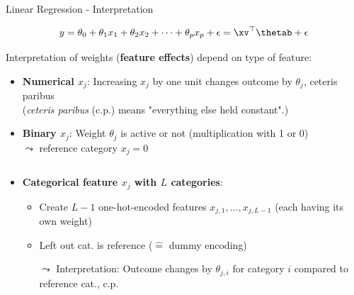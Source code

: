 \documentclass[11pt,compress,t,notes=noshow, aspectratio=169, xcolor=table]{beamer}
\begin{document}

\begin{frame}{Linear Regression - Interpretation}

$$y = \theta_0 + \theta_1 x_1 + \theta_2 x_2 + \dots + \theta_p x_p + \epsilon = \xv^\top \thetab + \epsilon$$

    Interpretation of weights (\textbf{feature effects}) depend on type of feature:
    \begin{itemize}[<+->]
        \item \textbf{Numerical $x_j$}: Increasing $x_j$ by one unit changes outcome by $\theta_j$, ceteris paribus \\ (\textit{ceteris paribus} (c.p.) means "everything else held constant".)
        \item \textbf{Binary $x_j$}: Weight $\theta_j$ is active or not (multiplication with 1 or 0)\\
        $\leadsto$ reference category $x_j = 0$
    \end{itemize}
%
\begin{columns}[T, totalwidth = \textwidth]
\begin{column}{0.62\textwidth}
    \begin{itemize}
        \item<3-> %
        \textbf{Categorical feature $x_j$ with $L$ categories}: 
        \begin{itemize}
            \item Create $L-1$ one-hot-encoded features $x_{j,1}, \hdots, x_{j,L-1}$ (each having its own weight)
            \item Left out cat. is reference ($\hat =$ dummy encoding)
            \item[$\leadsto$] Interpretation:
        Outcome changes by $\theta_{j,i}$ for category $i$ compared to reference cat.,  c.p.
        \end{itemize}

\end{itemize}
\end{column}
\end{columns}
\end{frame}
\end{document}
